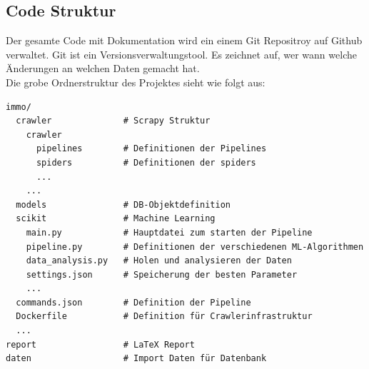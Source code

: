 \subsection{Code Struktur}
Der gesamte Code mit Dokumentation wird ein einem Git Repositroy auf Github verwaltet. Git ist ein Versionsverwaltungstool. Es zeichnet auf, wer wann welche Änderungen an welchen Daten gemacht hat.\\
Die grobe Ordnerstruktur des Projektes sieht wie folgt aus:
\begin{verbatim}
immo/
  crawler              # Scrapy Struktur
    crawler
      pipelines        # Definitionen der Pipelines
      spiders          # Definitionen der spiders
      ...
    ...
  models               # DB-Objektdefinition
  scikit               # Machine Learning
    main.py            # Hauptdatei zum starten der Pipeline
    pipeline.py        # Definitionen der verschiedenen ML-Algorithmen
    data_analysis.py   # Holen und analysieren der Daten
    settings.json      # Speicherung der besten Parameter
    ...
  commands.json        # Definition der Pipeline
  Dockerfile           # Definition für Crawlerinfrastruktur
  ...
report                 # LaTeX Report
daten                  # Import Daten für Datenbank
\end{verbatim}
